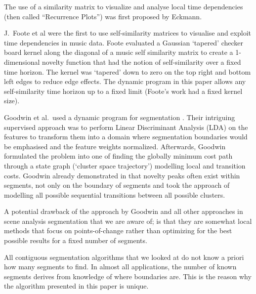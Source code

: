 \documentclass[twocolumn]{article}
\begin{document}
	The use of a similarity matrix to visualize and analyse local time dependencies (then called ``Recurrence Plots'') was first proposed by Eckmann\citep{eckmann1987recurrence}.
	
	J.\ Foote et al \citep{foote1999visualizing,foote1997similarity,foote2000automatic,foote2003media,foote2001visualizing} were the first to use self-similarity matrices to visualise and exploit time dependencies in music data. Foote evaluated a Gaussian `tapered' checker board kernel along the diagonal of a music self similarity matrix to create a 1-dimensional novelty function that had the notion of self-similarity over a fixed time horizon. The kernel was `tapered' down to zero on the top right and bottom left edges to reduce edge effects. The dynamic program in this paper allows any self-similarity time horizon up to a fixed limit (Foote's work had a fixed kernel size).
	
	Goodwin et al.\ used a dynamic program for segmentation \citep{goodwin2004dynamic}. Their intriguing supervised approach was to perform Linear Discriminant Analysis (LDA) on the features to transform them into a domain where segmentation boundaries would be emphasised and the feature weights normalized. Afterwards, Goodwin formulated the problem into one of finding the globally minimum cost path through a state graph (`cluster space trajectory') modelling local and transition costs. Goodwin already demonstrated in \citep{goodwin2003audio} that novelty peaks often exist within segments, not only on the boundary of segments and took the approach of modelling all possible sequential transitions between all possible clusters.
	
	A potential drawback of the approach by Goodwin and all other approaches in scene analysis segmentation that we are aware of; is that they are somewhat local methods that focus on points-of-change rather than optimizing for the best possible results for a fixed number of segments. 
	
	All contiguous segmentation algorithms that we looked at do not know a priori how many segments to find. In almost all applications, the number of known segments derives from knowledge of where boundaries are. This is the reason why the algorithm presented in this paper is unique.  
	
	
\end{document}
